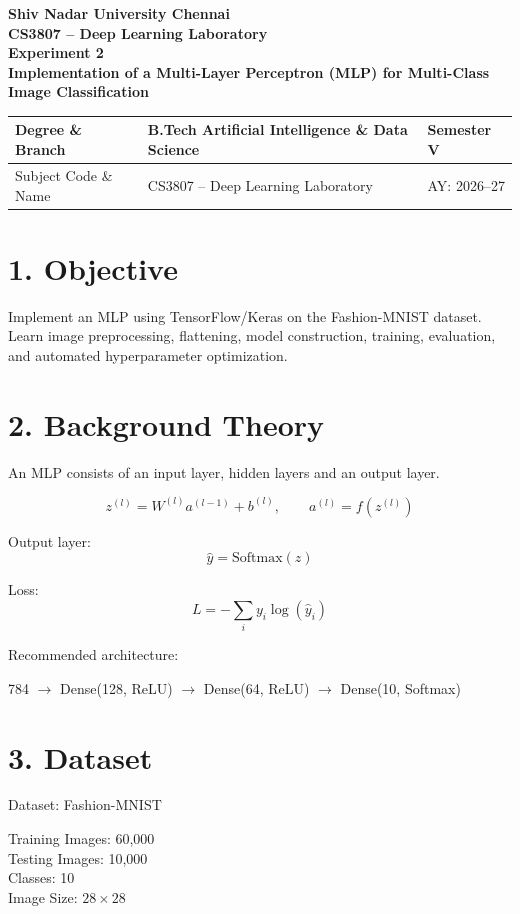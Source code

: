 \documentclass[11pt]{article}
\begin{document}
\begin{center}
{\Large\textbf{Shiv Nadar University Chennai}}\\
\textbf{CS3807 -- Deep Learning Laboratory}\\
\textbf{Experiment 2}\\
{\large\textbf{Implementation of a Multi-Layer Perceptron (MLP) for Multi-Class Image Classification}}
\end{center}

\renewcommand{\arraystretch}{1.25}

\begin{tabular}{|p{3.8cm}|p{8cm}|p{2cm}|}
\hline
Degree \& Branch & B.Tech Artificial Intelligence \& Data Science & Semester V\\ \hline
Subject Code \& Name & CS3807 -- Deep Learning Laboratory & AY: 2026--27\\ \hline
\end{tabular}

\section*{1. Objective}
Implement an MLP using TensorFlow/Keras on the Fashion-MNIST dataset. Learn image preprocessing, flattening, model construction, training, evaluation, and automated hyperparameter optimization.

\section*{2. Background Theory}
An MLP consists of an input layer, hidden layers and an output layer.

\[
z^{(l)}=W^{(l)}a^{(l-1)}+b^{(l)},\qquad
a^{(l)}=f(z^{(l)})
\]

Output layer:
\[
\hat y=\mathrm{Softmax}(z)
\]

Loss:
\[
L=-\sum_i y_i\log(\hat y_i)
\]

Recommended architecture:

\begin{center}
784 $\rightarrow$ Dense(128, ReLU) $\rightarrow$ Dense(64, ReLU) $\rightarrow$ Dense(10, Softmax)
\end{center}

\section*{3. Dataset}
Dataset: Fashion-MNIST

Training Images: 60,000 \\
Testing Images: 10,000 \\
Classes: 10 \\
Image Size: $28\times28$
\end{document}
